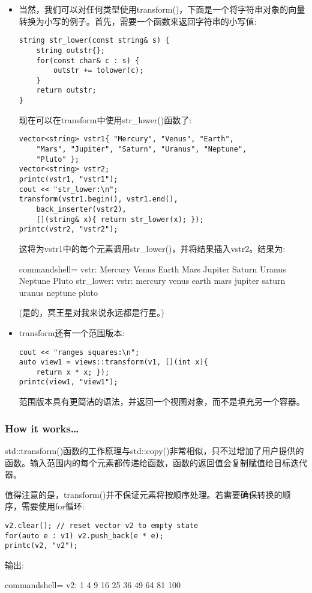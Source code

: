 \begin{itemize}
\item 
当然，我们可以对任何类型使用transform()，下面是一个将字符串对象的向量转换为小写的例子。首先，需要一个函数来返回字符串的小写值:

\begin{lstlisting}[style=styleCXX]
string str_lower(const string& s) {
	string outstr{};
	for(const char& c : s) {
		outstr += tolower(c);
	}
	return outstr;
}
\end{lstlisting}

现在可以在transform中使用str\_lower()函数了:

\begin{lstlisting}[style=styleCXX]
vector<string> vstr1{ "Mercury", "Venus", "Earth",
	"Mars", "Jupiter", "Saturn", "Uranus", "Neptune",
	"Pluto" };
vector<string> vstr2;
printc(vstr1, "vstr1");
cout << "str_lower:\n";
transform(vstr1.begin(), vstr1.end(),
	back_inserter(vstr2),
	[](string& x){ return str_lower(x); });
printc(vstr2, "vstr2");
\end{lstlisting}

这将为vstr1中的每个元素调用str\_lower()，并将结果插入vstr2。结果为:

\begin{tcblisting}{commandshell={}}
vstr: Mercury Venus Earth Mars Jupiter Saturn Uranus
Neptune Pluto
str_lower:
vstr: mercury venus earth mars jupiter saturn uranus
neptune pluto
\end{tcblisting}

(是的，冥王星对我来说永远都是行星。)

\item 
transform还有一个范围版本:

\begin{lstlisting}[style=styleCXX]
cout << "ranges squares:\n";
auto view1 = views::transform(v1, [](int x){
	return x * x; });
printc(view1, "view1");
\end{lstlisting}

范围版本具有更简洁的语法，并返回一个视图对象，而不是填充另一个容器。
\end{itemize}

\subsubsection{How it works…}

std::transform()函数的工作原理与std::copy()非常相似，只不过增加了用户提供的函数。输入范围内的每个元素都传递给函数，函数的返回值会复制赋值给目标迭代器。

值得注意的是，transform()并不保证元素将按顺序处理。若需要确保转换的顺序，需要使用for循环:

\begin{lstlisting}[style=styleCXX]
v2.clear(); // reset vector v2 to empty state
for(auto e : v1) v2.push_back(e * e);
printc(v2, "v2");
\end{lstlisting}

输出:

\begin{tcblisting}{commandshell={}}
v2: 1 4 9 16 25 36 49 64 81 100
\end{tcblisting}
















